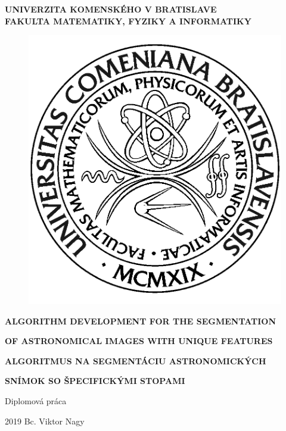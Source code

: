 \documentclass[12pt, a4paper, oneside]{book}
\newcommand\mfthesistype{Diplomová práca}
\newcommand\mfauthor{Bc. Viktor Nagy}
\newcommand\mfuniversity{UNIVERZITA KOMENSKÉHO V BRATISLAVE}
\newcommand\mffaculty{FAKULTA MATEMATIKY, FYZIKY A INFORMATIKY}
\begin{document}
\frontmatter


\noindent
\begin{minipage}{\textwidth}
\begin{center}
\textbf{\mfuniversity \\
\mffaculty}
\end{center}
\end{minipage}

\vfill
\begin{figure}[!hbt]
    \begin{center}
        \includegraphics{images/logo_fmph}
        \label{img:logo}
    \end{center}
\end{figure}
\begin{center}
    \begin{minipage}{0.8\textwidth}
        \centerline{\textbf{\Large\MakeUppercase{Algorithm development for the segmentation}}}
        \centerline{\textbf{\Large\MakeUppercase{of astronomical images with unique features}}}
        \smallskip
        \smallskip
        \centerline{\textbf{\Large\MakeUppercase{Algoritmus na segmentáciu astronomických}}}
        \centerline{\textbf{\Large\MakeUppercase{snímok so špecifickými stopami}}}
        \smallskip
        \centerline{\mfthesistype}
    \end{minipage}
\end{center}
\vfill
2019 \hfill
\mfauthor
\eject
\end{document}
